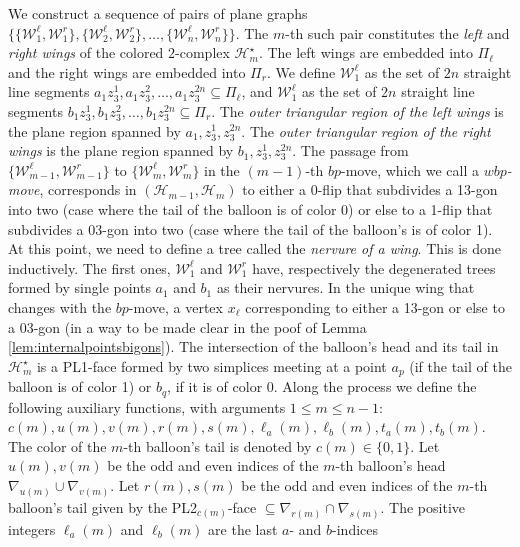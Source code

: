 We construct a 
sequence of pairs of plane
graphs $\{\{\mathcal{W}^\ell_1,\mathcal{W}^r_1\},
\{\mathcal{W}^\ell_2,\mathcal{W}^r_2\},\ldots,
\{\mathcal{W}^\ell_n,\mathcal{W}^r_n\} \}.$ The $m$-th such pair
constitutes the {\em left} and {\em right wings}  of the colored $2$-complex
$\mathcal{H}_m^\star$. The left wings are embedded into $\Pi_\ell$ and
the right wings are embedded into $\Pi_r$. 
We define $\mathcal{W}^\ell_1$ as the set of $2n$ straight line segments
$a_1z_3^1, a_1z_3^2, \ldots, a_1z_3^{2n} \subseteq \Pi_\ell$,
and $\mathcal{W}^\ell_1$ as the set of $2n$ straight line segments
$b_1z_3^1, b_1z_3^2, \ldots, b_1z_3^{2n}  \subseteq \Pi_r$.
The {\em outer triangular region of the left wings} is the plane region
spanned by $a_1, z_3^1,z_3^{2n}$. The {\em outer triangular region of 
the right wings} is the plane region spanned by
$b_1, z_3^1, z_3^{2n}$. 
The passage from $\{\mathcal{W}^\ell_{m-1},\mathcal{W}^r_{m-1}\}$
to $\{\mathcal{W}^\ell_m,\mathcal{W}^r_m\}$ in the $(m-1)$-th $bp$-move,
which we call a {\em $wbp$-move}, corresponds
in $(\mathcal{H}_{m-1}, \mathcal{H}_{m})$ to either a 
0-flip that subdivides a 13-gon into two (case
where the tail of the balloon is of color 0)
or else to a 1-flip that subdivides a 03-gon into two (case
where the tail of the balloon's is of color 1).  
At this point, we need to define a tree called the  {\em nervure of a wing}.
This is done inductively.
The first ones, $\mathcal{W}^\ell_1$ and $\mathcal{W}^r_1$ have, respectively 
the degenerated trees formed by single points $a_1$ and $b_1$ as their nervures.
In the unique wing that changes with the $bp$-move, a vertex $x_\ell$ corresponding
to either a 13-gon or else to a 03-gon (in a way to be made clear in the poof of
Lemma \ref{lem:internalpointsbigons}).
The intersection of the balloon's head and 
its tail in $\mathcal{H}^\star_m$ is a PL1-face formed by two
simplices meeting at a point $a_p$ (if the tail of the balloon is of color 1)
or $b_q$, if it is of color 0. 
Along the process we define the following auxiliary functions, with arguments
 $1 \le m \le n-1$:  
$c(m),u(m),v(m),r(m),s(m),
\ell_a(m), \ell_b(m), t_a(m), t_b(m).$
The color
of the $m$-th balloon's tail is denoted by $c(m) \in \{0,1\}$.
Let $u(m), v(m)$ be the odd and even indices of the $m$-th 
balloon's head $\nabla_{u(m)} \cup \nabla_{v(m)}$. 
Let $r(m), s(m)$ be the odd and even indices of the $m$-th 
balloon's tail given by the PL2$_{c(m)}$-face $\subseteq 
\nabla_{r(m)} \cap \nabla_{s(m)}$.
The positive integers $\ell_a(m)$ and $\ell_b(m)$ are the last $a$- and $b$-indices
